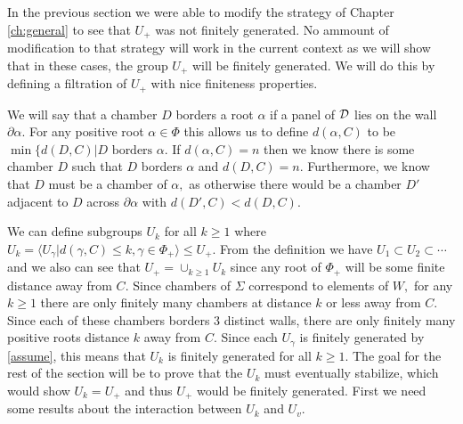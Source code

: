 \documentclass[class=book, crop=false]{standalone}
\begin{document}
In the previous section we were able to modify the strategy of Chapter \ref{ch:general} to see that $U_+$ was not finitely generated. No ammount of modification to that strategy will work in the current context as we will show that in these cases, the group $U_+$ will be finitely generated. We will do this by defining a filtration of $U_+$ with nice finiteness properties.

We will say that a chamber $D$ borders a root $\alpha$ if a panel of $\mathcal{D}$ lies on the wall $\partial \alpha.$ For any positive root $\alpha\in \Phi$ this allows us to define $d(\alpha,C)$ to be $\min\{d(D,C)|D\text{ borders }\alpha.$ If $d(\alpha,C)=n$ then we know there is some chamber $D$ such that $D$ borders $\alpha$ and $d(D,C)=n.$ Furthermore, we know that $D$ must be a chamber of $\alpha,$ as otherwise there would be a chamber $D'$ adjacent to $D$ across $\partial\alpha$ with $d(D',C)<d(D,C).$ 

	We can define subgroups $U_k$ for all $k\ge 1$ where $U_k=\langle U_\gamma|d(\gamma,C)\le k,\gamma\in \Phi_+\rangle\le U_+.$ From the definition we have $U_1\subset U_2\subset \cdots$ and we also can see that $U_+=\cup_{k\ge 1}U_k$ since any root of $\Phi_+$ will be some finite distance away from $C.$ Since chambers of $\Sigma$ correspond to elements of $W,$ for any $k\ge 1$ there are only finitely many chambers at distance $k$ or less away from $C.$ Since each of these chambers borders 3 distinct walls, there are only finitely many positive roots distance $k$ away from $C.$ Since each $U_\gamma$ is finitely generated by \eqref{assume}, this means that $U_k$ is finitely generated for all $k\ge 1.$ The goal for the rest of the section will be to prove that the $U_k$ must eventually stabilize, which would show $U_k=U_+$ and thus $U_+$ would be finitely generated. First we need some results about the interaction between $U_k$ and $U_v.$
\end{document}

